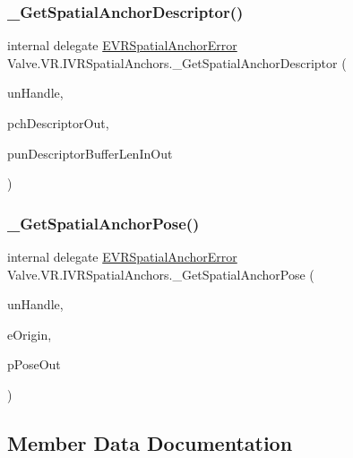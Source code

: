\subsubsection{\texorpdfstring{\_GetSpatialAnchorDescriptor()}{\_GetSpatialAnchorDescriptor()}}
{\footnotesize\ttfamily internal delegate \mbox{\hyperlink{namespace_valve_1_1_v_r_ab0aeb9b02c0851286deb0b4134b220d4}{E\+V\+R\+Spatial\+Anchor\+Error}} Valve.\+V\+R.\+I\+V\+R\+Spatial\+Anchors.\+\_\+\+Get\+Spatial\+Anchor\+Descriptor (\begin{DoxyParamCaption}\item[{uint}]{un\+Handle,  }\item[{System.\+Text.\+String\+Builder}]{pch\+Descriptor\+Out,  }\item[{ref uint}]{pun\+Descriptor\+Buffer\+Len\+In\+Out }\end{DoxyParamCaption})}

\mbox{\label{struct_valve_1_1_v_r_1_1_i_v_r_spatial_anchors_a77ab8b9b1a7b448eab589d2d84b43ca5}} 
\subsubsection{\texorpdfstring{\_GetSpatialAnchorPose()}{\_GetSpatialAnchorPose()}}
{\footnotesize\ttfamily internal delegate \mbox{\hyperlink{namespace_valve_1_1_v_r_ab0aeb9b02c0851286deb0b4134b220d4}{E\+V\+R\+Spatial\+Anchor\+Error}} Valve.\+V\+R.\+I\+V\+R\+Spatial\+Anchors.\+\_\+\+Get\+Spatial\+Anchor\+Pose (\begin{DoxyParamCaption}\item[{uint}]{un\+Handle,  }\item[{\mbox{\hyperlink{namespace_valve_1_1_v_r_a29be99a3c2f780157bd490db06a7f12f}{E\+Tracking\+Universe\+Origin}}}]{e\+Origin,  }\item[{ref \mbox{\hyperlink{struct_valve_1_1_v_r_1_1_spatial_anchor_pose__t}{Spatial\+Anchor\+Pose\+\_\+t}}}]{p\+Pose\+Out }\end{DoxyParamCaption})}



\subsection{Member Data Documentation}
\mbox{\label{struct_valve_1_1_v_r_1_1_i_v_r_spatial_anchors_a2bc2a5cbcd94e73c700296c719887af4}} 
